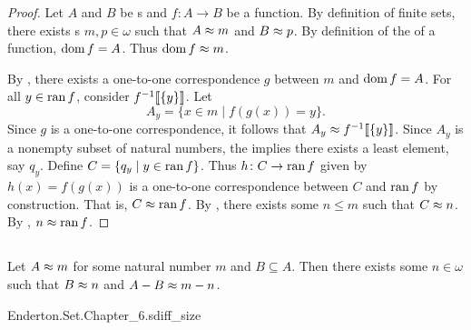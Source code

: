 \documentclass{report}
\begin{document}
  \begin{proof}
    Let $A$ and $B$ be s and $f \colon A \rightarrow B$
      be a function.
    By definition of finite sets, there exists s
      $m, p \in \omega$ such that $A \approx m$ and $B \approx p$.
    By definition of the  of a function, $\mathop{\text{dom}}{f} = A$.
    Thus $\mathop{\text{dom}}{f} \approx m$.

    By , there exists a one-to-one correspondence $g$
      between $m$ and $\mathop{\text{dom}}{f} = A$.
    For all $y \in \mathop{\text{ran}}{f}$, consider $f^{-1}\!\left\llbracket\{y\}\right\rrbracket$.
    Let $$A_y = \{ x \in m \mid f(g(x)) = y \}.$$
    Since $g$ is a one-to-one correspondence, it follows that
      $A_y \approx f^{-1}\!\left\llbracket\{y\}\right\rrbracket$.
    Since $A_y$ is a nonempty subset of natural numbers, the
       implies there exists a least
      element, say $q_y$.
    Define $C = \{q_y \mid y \in \mathop{\text{ran}}{f}\}$.
    Thus $h \colon C \rightarrow \mathop{\text{ran}}{f}$ given by $h(x) = f(g(x))$ is a
      one-to-one correspondence between $C$ and $\mathop{\text{ran}}{f}$ by construction.
    That is, $C \approx \mathop{\text{ran}}{f}$.
    By , there exists some $n \leq m$ such that
      $C \approx n$.
    By , $n \approx \mathop{\text{ran}}{f}$.
  \end{proof}

\subsection{}%

  \begin{lemma}
    Let $A \approx m$ for some natural number $m$ and $B \subseteq A$.
    Then there exists some $n \in \omega$ such that $B \approx n$ and
      $A - B \approx m - n$.
  \end{lemma}

    {Enderton.Set.Chapter\_6.sdiff\_size}
\end{document}
